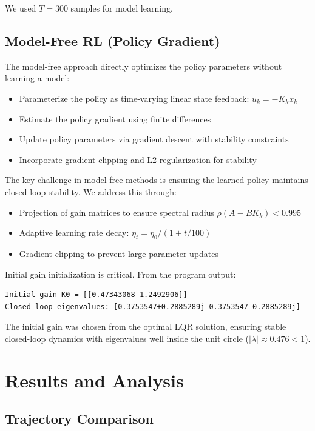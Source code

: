 \documentclass{report}
\begin{document}
We used $T = 300$ samples for model learning.

\subsection{Model-Free RL (Policy Gradient)}

The model-free approach directly optimizes the policy parameters without learning a model:

\begin{itemize}
    \item Parameterize the policy as time-varying linear state feedback: $u_k = -K_k x_k$
    \item Estimate the policy gradient using finite differences
    \item Update policy parameters via gradient descent with stability constraints
    \item Incorporate gradient clipping and L2 regularization for stability
\end{itemize}

The key challenge in model-free methods is ensuring the learned policy maintains closed-loop stability. We address this through:
\begin{itemize}
    \item Projection of gain matrices to ensure spectral radius $\rho(A - BK_k) < 0.995$
    \item Adaptive learning rate decay: $\eta_t = \eta_0 / (1 + t/100)$
    \item Gradient clipping to prevent large parameter updates
\end{itemize}

Initial gain initialization is critical. From the program output:
\begin{verbatim}
Initial gain K0 = [[0.47343068 1.2492906]]
Closed-loop eigenvalues: [0.3753547+0.2885289j 0.3753547-0.2885289j]
\end{verbatim}

The initial gain was chosen from the optimal LQR solution, ensuring stable closed-loop dynamics with eigenvalues well inside the unit circle ($|\lambda| \approx 0.476 < 1$).

\section{Results and Analysis}

\subsection{Trajectory Comparison}
\end{document}
